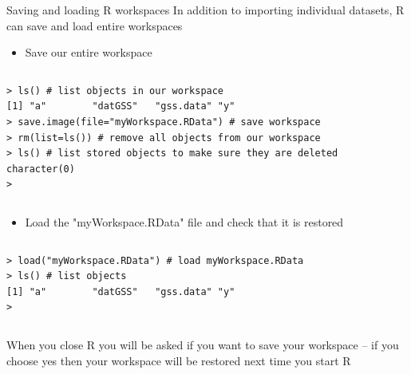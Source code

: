 \documentclass[table,smaller]{beamer}
\begin{document}
\begin{frame}[fragile,label=sec-5-5]{Saving and loading R  workspaces}
 In addition to importing individual datasets, R can save and load entire workspaces
\begin{itemize}
\item Save our entire workspace
\end{itemize}
\vspace{-.5em}
\begin{columns}
\begin{block}{}
\begin{verbatim}
> ls() # list objects in our workspace
[1] "a"        "datGSS"   "gss.data" "y"       
> save.image(file="myWorkspace.RData") # save workspace 
> rm(list=ls()) # remove all objects from our workspace 
> ls() # list stored objects to make sure they are deleted
character(0)
>
\end{verbatim}
\end{block}
\end{columns}
\vspace{.5em}

\begin{itemize}
\item Load the "myWorkspace.RData" file and check that it is restored
\end{itemize}

\vspace{-.5em}
\begin{columns}
\begin{block}{}
\begin{verbatim}
> load("myWorkspace.RData") # load myWorkspace.RData
> ls() # list objects
[1] "a"        "datGSS"   "gss.data" "y"       
>
\end{verbatim}
\end{block}
\end{columns}
\vspace{.5em}

When you close R you will be asked if you want to save your workspace -- if you choose yes then your workspace will be restored next time you start R
\end{frame}
\end{document}

